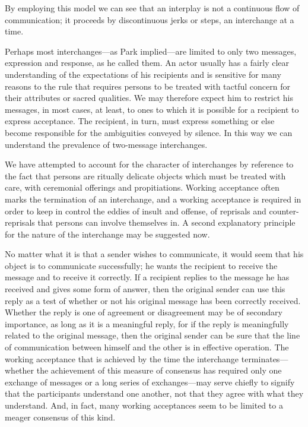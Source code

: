 \documentclass[twoside,symmetric,nobib,justified]{tufte-book}
\begin{document}
\noindent By employing this model we can see that an interplay is not a continuous
flow of communication; it proceeds by discontinuous jerks or steps, an
interchange at a time.

Perhaps most interchanges---as Park implied---are limited to only two
messages, expression and response, as he called them. An actor usually
has a fairly clear understanding of the expectations of his recipients
and is sensitive for many reasons to the rule that requires persons to
be treated with tactful concern for their attributes or sacred
qualities. We may therefore expect him to restrict his messages, in most
cases, at least, to ones to which it is possible for a recipient to
express acceptance. The recipient, in turn, must express something or
else become responsible for the ambiguities conveyed by silence. In this
way we can understand the prevalence of two-message interchanges.

We have attempted to account for the character of interchanges by
reference to the fact that persons are ritually delicate objects which
must be treated with care, with ceremonial offerings and propitiations.
Working acceptance often marks the termination of an interchange, and a
working acceptance is required in order to keep in control the eddies of
insult and offense, of reprisals and counter-reprisals that persons can
involve themselves in. A second explanatory principle for the nature of
the interchange may be suggested now.

No matter what it is that a sender wishes to communicate, it would seem
that his object is to communicate successfully; he wants the recipient
to receive the message and to receive it correctly. If a recipient
replies to the message he has received and gives some form of answer,
then the original sender can use this reply as a test of whether or not
his original message has been correctly received. Whether the reply is
one of agreement or disagreement may be of secondary importance, as long
as it is a meaningful reply, for if the reply is meaningfully related to
the original message, then the original sender can be sure that the line
of communication between himself and the other is in effective
operation. The working acceptance that is achieved by the time the
interchange terminates---whether the achievement of this measure of
consensus has required only one exchange of messages or a long series of
exchanges---may serve chiefly to signify that the participants
understand one another, not that they agree with what they understand.
And, in fact, many working acceptances seem to be limited to a meager
consensus of this kind.
\end{document}
